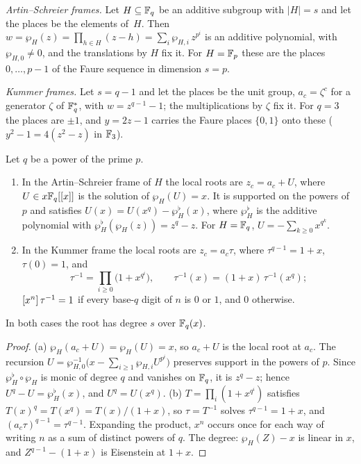 \emph{Artin--Schreier frames.} Let $H\subseteq\mathbb{F}_q$ be an additive subgroup with $|H|=s$ and let the places be the elements of~$H$. Then $w=\wp_H(z)=\prod_{h\in H}(z-h)=\sum_i\wp_{H,i}\,z^{p^i}$ is an additive polynomial, with $\wp_{H,0}\ne0$, and the translations by $H$ fix it. For $H=\mathbb{F}_p$ these are the places $0,\dots,p-1$ of the Faure sequence in dimension $s=p$.

\emph{Kummer frames.} Let $s=q-1$ and let the places be the unit group, $a_c=\zeta^c$ for a generator $\zeta$ of $\mathbb{F}_q^*$, with $w=z^{q-1}-1$; the multiplications by $\zeta$ fix it. For $q=3$ the places are $\pm1$, and $y=2z-1$ carries the Faure places $\{0,1\}$ onto these ($y^2-1=4(z^2-z)$ in $\mathbb{F}_3$).

\begin{lemma}\label{lem:frames}
Let $q$ be a power of the prime $p$.
\begin{enumerate}
\item[(a)] In the Artin--Schreier frame of $H$ the local roots are $z_c=a_c+U$, where $U\in x\mathbb{F}_q[[x]]$ is the solution of $\wp_H(U)=x$. It is supported on the powers of $p$ and satisfies $U(x)=U(x^q)-\wp^\flat_H(x)$, where $\wp^\flat_H$ is the additive polynomial with $\wp^\flat_H(\wp_H(z))=z^q-z$. For $H=\mathbb{F}_q$, $U=-\sum_{k\ge0}x^{q^k}$.
\item[(b)] In the Kummer frame the local roots are $z_c=a_c\tau$, where $\tau^{q-1}=1+x$, $\tau(0)=1$, and
\[
\tau^{-1}=\prod_{i\ge0}\bigl(1+x^{q^i}\bigr),\qquad \tau^{-1}(x)=(1+x)\,\tau^{-1}(x^q);
\]
$[x^{n}]\,\tau^{-1}=1$ if every base-$q$ digit of $n$ is $0$ or $1$, and $0$ otherwise.
\end{enumerate}
In both cases the root has degree $s$ over $\mathbb{F}_q(x)$.
\end{lemma}

\begin{proof}
(a) $\wp_H(a_c+U)=\wp_H(U)=x$, so $a_c+U$ is the local root at $a_c$. The recursion $U=\wp_{H,0}^{-1}\bigl(x-\sum_{i\ge1}\wp_{H,i}U^{p^i}\bigr)$ preserves support in the powers of $p$. Since $\wp^\flat_H\circ\wp_H$ is monic of degree $q$ and vanishes on $\mathbb{F}_q$, it is $z^q-z$; hence $U^q-U=\wp^\flat_H(x)$, and $U^q=U(x^q)$. (b) $T=\prod_i(1+x^{q^i})$ satisfies $T(x)^q=T(x^q)=T(x)/(1+x)$, so $\tau=T^{-1}$ solves $\tau^{q-1}=1+x$, and $(a_c\tau)^{q-1}=\tau^{q-1}$. Expanding the product, $x^n$ occurs once for each way of writing $n$ as a sum of distinct powers of $q$. The degree: $\wp_H(Z)-x$ is linear in $x$, and $Z^{q-1}-(1+x)$ is Eisenstein at $1+x$.
\end{proof}

